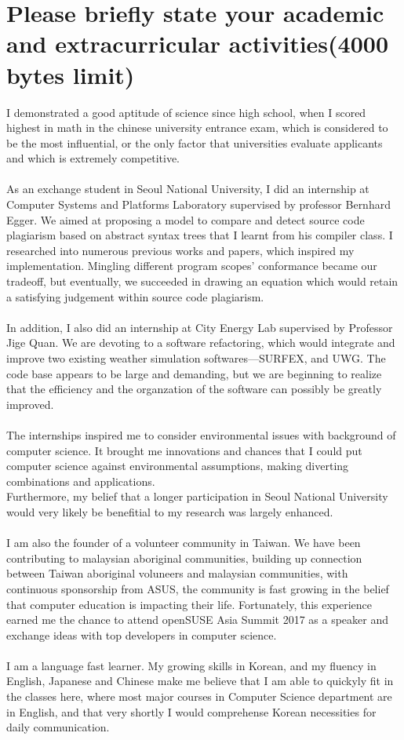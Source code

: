 \documentclass{article}
\begin{document}
\section{Please briefly state your academic and extracurricular activities(4000 bytes limit)}
I demonstrated a good aptitude of science since high school, when I scored highest in math in the chinese university entrance exam, which is considered to be the most influential, or the only factor that universities evaluate applicants and which is extremely competitive. \\
\\
As an exchange student in Seoul National University, I did an internship at Computer Systems and Platforms Laboratory supervised by professor Bernhard Egger. We aimed at proposing a model to compare and detect source code plagiarism based on abstract syntax trees that I learnt from his compiler class. I researched into numerous previous works and papers, which inspired my implementation. Mingling different program scopes' conformance became our tradeoff, but eventually, we succeeded in drawing an equation which would retain a satisfying judgement within source code plagiarism.\\
\\
In addition, I also did an internship at City Energy Lab supervised by Professor Jige Quan. We are devoting to a software refactoring, which would integrate and improve two existing weather simulation softwares---SURFEX, and UWG. The code base appears to be large and demanding, but we are beginning to realize that the efficiency and the organzation of the software can possibly be greatly improved.\\
\\
The internships inspired me to consider environmental issues with background of computer science. It brought me innovations and chances that I could put computer science against environmental assumptions, making diverting combinations and applications. \\
Furthermore, my belief that a longer participation in Seoul National University would very likely be benefitial to my research was largely enhanced. \\
\\
I am also the founder of a volunteer community in Taiwan. We have been contributing to malaysian aboriginal communities, building up connection between Taiwan aboriginal voluneers and malaysian communities, with continuous sponsorship from ASUS, the community is fast growing in the belief that computer education is impacting their life. Fortunately, this experience earned me the chance to attend openSUSE Asia Summit 2017 as a speaker and exchange ideas with top developers in computer science.  \\
\\
I am a language fast learner. My growing skills in Korean, and my fluency in English, Japanese and Chinese make me believe that I am able to quickyly fit in the classes here, where most major courses in Computer Science department are in English, and that very shortly I would comprehense Korean necessities for daily communication. \\
\\
\end{document}
